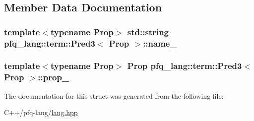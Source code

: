 \subsection{Member Data Documentation}
\hypertarget{structpfq__lang_1_1term_1_1Pred3_ac6c3e6209e74470fe1e97a1c0d7187a7}{
\subsubsection[{name\-\_\-}]{\setlength{\rightskip}{0pt plus 5cm}template$<$typename Prop$>$ std\-::string {\bf pfq\-\_\-lang\-::term\-::\-Pred3}$<$ {\bf Prop} $>$\-::name\-\_\-}}\label{structpfq__lang_1_1term_1_1Pred3_ac6c3e6209e74470fe1e97a1c0d7187a7}
\hypertarget{structpfq__lang_1_1term_1_1Pred3_aa6450a183d05751a2d9cbfcf3b01a1dd}{
\subsubsection[{prop\-\_\-}]{\setlength{\rightskip}{0pt plus 5cm}template$<$typename Prop$>$ {\bf Prop} {\bf pfq\-\_\-lang\-::term\-::\-Pred3}$<$ {\bf Prop} $>$\-::prop\-\_\-}}\label{structpfq__lang_1_1term_1_1Pred3_aa6450a183d05751a2d9cbfcf3b01a1dd}


The documentation for this struct was generated from the following file\-:\begin{DoxyCompactItemize}
\item 
C++/pfq-\/lang/\hyperlink{lang_8hpp}{lang.\-hpp}\end{DoxyCompactItemize}
